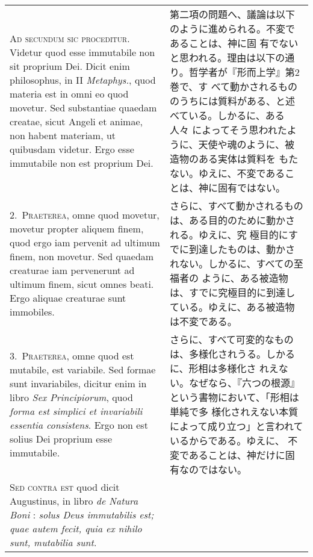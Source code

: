 \documentclass[10pt]{jsarticle} %
\begin{document}
\begin{longtable}{p{21em}p{21em}}

{\huge A}{\scshape d secundum sic proceditur}. Videtur quod esse
immutabile non sit proprium Dei. Dicit enim philosophus, in II {\it
Metaphys.}, quod materia est in omni eo quod movetur. Sed substantiae
quaedam creatae, sicut Angeli et animae, non habent materiam, ut
quibusdam videtur. Ergo esse immutabile non est proprium Dei.


&

第二項の問題へ、議論は以下のように進められる。不変であることは、神に固
有でないと思われる。理由は以下の通り。哲学者が『形而上学』第2巻で、す
べて動かされるもののうちには質料がある、と述べている。しかるに、ある人々
によってそう思われたように、天使や魂のように、被造物のある実体は質料を
もたない。ゆえに、不変であることは、神に固有ではない。

\\

2.~{\scshape Praeterea}, omne quod movetur, movetur propter aliquem
   finem, quod ergo iam pervenit ad ultimum finem, non movetur. Sed
   quaedam creaturae iam pervenerunt ad ultimum finem, sicut omnes
   beati. Ergo aliquae creaturae sunt immobiles.

&

さらに、すべて動かされるものは、ある目的のために動かされる。ゆえに、究
極目的にすでに到達したものは、動かされない。しかるに、すべての至福者の
ように、ある被造物は、すでに究極目的に到達している。ゆえに、ある被造物
は不変である。

\\


3.~{\scshape Praeterea}, omne quod est mutabile, est variabile. Sed
formae sunt invariabiles, dicitur enim in libro {\it Sex
Principiorum}, quod {\itshape forma est simplici et invariabili
essentia consistens}. Ergo non est solius Dei proprium esse
immutabile.


&

さらに、すべて可変的なものは、多様化されうる。しかるに、形相は多様化さ
れえない。なぜなら、『六つの根源』という書物において、「形相は単純で多
様化されえない本質によって成り立つ」と言われているからである。ゆえに、
不変であることは、神だけに固有なのではない。

\\


{\scshape Sed contra est} quod dicit Augustinus, in libro {\it de
Natura Boni} : {\itshape solus Deus immutabilis est; quae autem fecit,
quia ex nihilo sunt, mutabilia sunt}.


\end{longtable}
\end{document}
